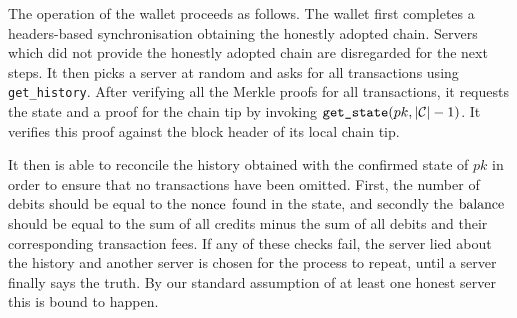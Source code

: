 The operation of the wallet proceeds as follows. The wallet first completes a headers-based synchronisation obtaining the honestly adopted chain. Servers which did not provide the honestly adopted chain are disregarded for the next steps. It then picks a server at random and asks for all transactions using \texttt{get\_history}. After verifying all the Merkle proofs for all transactions, it requests the state and a proof for the chain tip by invoking $\texttt{get\_state}(pk, |\mathcal{C}|-1)$. It verifies this proof against the block header of its local chain tip.

It then is able to reconcile the history obtained with the confirmed state of $pk$ in order to ensure that no transactions have been omitted. First, the number of debits should be equal to the $\text{nonce}$ found in the state, and secondly the $\text{balance}$ should be equal to the sum of all credits minus the sum of all debits and their corresponding transaction fees. If any of these checks fail, the server lied about the history and another server is chosen for the process to repeat, until a server finally says the truth. By our standard assumption of at least one honest server this is bound to happen.

